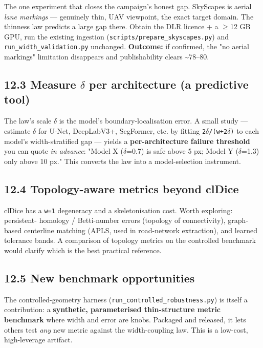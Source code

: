 \documentclass[11pt]{article}
\begin{document}
The one experiment that closes the campaign's honest gap. SkyScapes is aerial \textit{lane markings} --- genuinely thin, UAV viewpoint, the exact target domain. The thinness law predicts a large gap there. Obtain the DLR licence + a $\geq$12 GB GPU, run the existing ingestion (\texttt{scripts/prepare\_skyscapes.py}) and \texttt{run\_width\_validation.py} unchanged. \textbf{Outcome:} if confirmed, the "no aerial markings" limitation disappears and publishability clears \textasciitilde{}78--80.

\subsection*{12.3 Measure $\delta$ per architecture (a predictive tool)}

The law's scale \texttt{$\delta$} is the model's boundary-localisation error. A small study --- estimate \texttt{$\delta$} for U-Net, DeepLabV3+, SegFormer, etc. by fitting \texttt{2$\delta$/(w+2$\delta$)} to each model's width-stratified gap --- yields a \textbf{per-architecture failure threshold} you can quote \textit{in advance}: "Model X ($\delta$=0.7) is safe above 5 px; Model Y ($\delta$=1.3) only above 10 px." This converts the law into a model-selection instrument.

\subsection*{12.4 Topology-aware metrics beyond clDice}

clDice has a \texttt{w=1} degeneracy and a skeletonisation cost. Worth exploring: persistent- homology / Betti-number errors (topology of connectivity), graph-based centerline matching (APLS, used in road-network extraction), and learned tolerance bands. A comparison of topology metrics on the controlled benchmark would clarify which is the best practical reference.

\subsection*{12.5 New benchmark opportunities}

The controlled-geometry harness (\texttt{run\_controlled\_robustness.py}) is itself a contribution: a \textbf{synthetic, parameterised thin-structure metric benchmark} where width and error are knobs. Packaged and released, it lets others test \textit{any} new metric against the width-coupling law. This is a low-cost, high-leverage artifact.
\end{document}
